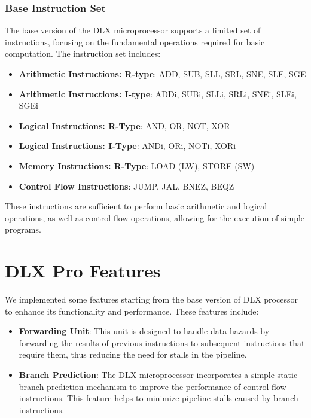 \subsubsection{Base Instruction Set}
The base version of the DLX microprocessor supports a limited set of instructions, focusing on the fundamental operations required for basic computation. The instruction set includes:
\begin{itemize}
    \item \textbf{Arithmetic Instructions: R-type}: ADD, SUB, SLL, SRL, SNE, SLE, SGE
    \item \textbf{Arithmetic Instructions: I-type}: ADDi, SUBi, SLLi, SRLi, SNEi, SLEi, SGEi
    \item \textbf{Logical Instructions: R-Type}: AND, OR, NOT, XOR
    \item \textbf{Logical Instructions: I-Type}: ANDi, ORi, NOTi, XORi
    \item \textbf{Memory Instructions: R-Type}: LOAD (LW), STORE (SW)
    \item \textbf{Control Flow Instructions}: JUMP, JAL, BNEZ, BEQZ
\end{itemize}


These instructions are sufficient to perform basic arithmetic and logical operations, as well as control flow operations, allowing for the execution of simple programs.

\section{DLX Pro Features}
We implemented some features starting from the base version of DLX processor to enhance its functionality and performance. These features include:
\begin{itemize}
    \item \textbf{Forwarding Unit}: This unit is designed to handle data hazards by forwarding the results of previous instructions to subsequent instructions that require them, thus reducing the need for stalls in the pipeline.
    \item \textbf{Branch Prediction}: The DLX microprocessor incorporates a simple static branch prediction mechanism to improve the performance of control flow instructions. This feature helps to minimize pipeline stalls caused by branch instructions.
\end{itemize}




